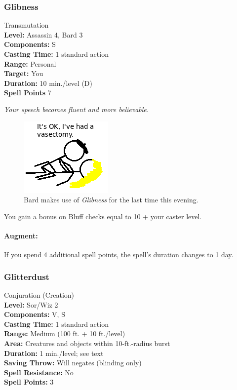 \subsubsection{Glibness}
\label{Spell:Glibness}
Transmutation
\\ \textbf{Level:} Assassin 4, Bard 3
\\ \textbf{Components:} S
\\ \textbf{Casting Time:} 1 standard action
\\ \textbf{Range:} Personal
\\ \textbf{Target:} You
\\ \textbf{Duration:} 10 min./level (D)
\\ \textbf{Spell Points} 7

\emph{Your speech becomes fluent and more believable.} 

\begin{figure}
  \caption{Bard makes use of \emph{Glibness} for the last time this evening.}
  \centering
    \includegraphics{Pics/Glibness.png}
\end{figure}

You gain a bonus on Bluff checks equal to 10 + your caster level.

\paragraph{Augment:} If you spend 4 additional spell points, the spell's duration changes to 1 day.
\subsubsection{Glitterdust}
\label{Spell:Glitterdust}
Conjuration (Creation)
\\ \textbf{Level:} Sor/Wiz 2
\\ \textbf{Components:} V, S
\\ \textbf{Casting Time:} 1 standard action
\\ \textbf{Range:} Medium (100 ft. + 10 ft./level)
\\ \textbf{Area:} Creatures and objects within 10-ft.-radius burst
\\ \textbf{Duration:} 1 min./level; see text
\\ \textbf{Saving Throw:} Will negates (blinding only)
\\ \textbf{Spell Resistance:} No
\\ \textbf{Spell Points:} 3

